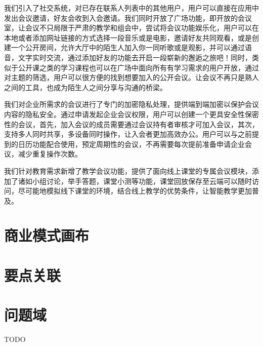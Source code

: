 \documentclass[a4paper,12pt]{article}
\begin{document}
我们引入了社交系统，对已存在联系人列表中的其他用户，用户可以直接在应用中发出会议邀请，好友会收到入会邀请。我们同时开放了广场功能，即开放的会议室，让会议不只局限于严肃的教学和组会中，尝试将会议功能娱乐化，用户可以在本地或者添加网址链接的方式选择一段音乐或是电影，邀请好友共同观看，或是创建一个公开房间，允许大厅中的陌生人加入你一同听歌或是观影，并可以通过语音，文字实时交流，通过添加好友的功能去开启一段崭新的邂逅之旅吧！同时，类似于公开课之类的学习课程也可以在广场中面向所有有学习需求的用户开放，通过对主题的筛选，用户可以很方便的找到想要加入的公开会议。让会议不再只是熟人之间的工具，也成为陌生人之间分享与沟通的桥梁。

我们对企业所需求的会议进行了专门的加密隐私处理，提供端到端加密以保护会议内容的隐私安全。通过申请发起企业会议权限，用户可以创建一个更具安全性保密性的会议，首先，加入会议的成员需要通过会议持有者审核才可加入会议，其次，支持多人同时共享，多设备同时操作，让入会者更加高效办公。用户可以与之前提到的日历功能配合使用，预定周期性的会议，不再需要每次提前准备申请企业会议，减少重复操作次数。

我们针对教育需求新增了教学会议功能，提供了面向线上课堂的专属会议模块，添加了诸如小组讨论，举手答题，课堂小测等功能，课堂回放保存至云端可以随时访问，尽可能地模拟线下课堂的环境，结合线上教学的优势条件，让智能教学更加普及。

\section{商业模式画布}

\section{要点关联}

\section{问题域}
TODO
\end{document}
